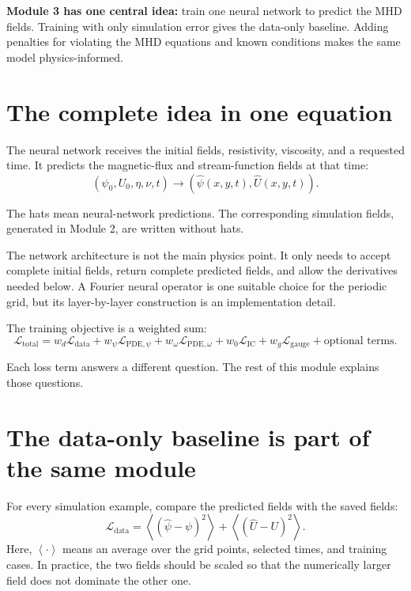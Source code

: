\documentclass[11pt]{article}
\newcommand{\avg}[1]{\left\langle #1\right\rangle}
\newcommand{\Ldata}{\mathcal L_{\mathrm{data}}}
\newcommand{\Lpdepsi}{\mathcal L_{\mathrm{PDE},\psi}}
\newcommand{\Lpdeomega}{\mathcal L_{\mathrm{PDE},\omega}}
\newcommand{\Lic}{\mathcal L_{\mathrm{IC}}}
\newcommand{\Lgauge}{\mathcal L_{\mathrm{gauge}}}
\newcommand{\Ltotal}{\mathcal L_{\mathrm{total}}}
\begin{document}

\begin{overviewbox}
\textbf{Module 3 has one central idea:} train one neural network to predict the MHD fields. Training with only simulation error gives the data-only baseline. Adding penalties for violating the MHD equations and known conditions makes the same model physics-informed.
\end{overviewbox}

\ProjectTOC

\section{The complete idea in one equation}

The neural network receives the initial fields, resistivity, viscosity, and a requested time. It predicts the magnetic-flux and stream-function fields at that time:
\begin{equation}
\boxed{
(\psi_0,U_0,\eta,\nu,t)
\longrightarrow
(\widehat\psi(x,y,t),\widehat U(x,y,t)).
}
\end{equation}

The hats mean neural-network predictions. The corresponding simulation fields, generated in Module 2, are written without hats.

The network architecture is not the main physics point. It only needs to accept complete initial fields, return complete predicted fields, and allow the derivatives needed below. A Fourier neural operator is one suitable choice for the periodic grid, but its layer-by-layer construction is an implementation detail.

The training objective is a weighted sum:
\begin{equation}
\boxed{
\Ltotal
=w_d\Ldata
+w_{\psi}\Lpdepsi
+w_{\omega}\Lpdeomega
+w_0\Lic
+w_g\Lgauge
+\text{optional terms}.
}
\label{eq:total_preview}
\end{equation}

Each loss term answers a different question. The rest of this module explains those questions.

\section{The data-only baseline is part of the same module}

For every simulation example, compare the predicted fields with the saved fields:
\begin{equation}
\boxed{
\Ldata
=\avg{(\widehat\psi-\psi)^2}
+\avg{(\widehat U-U)^2}.
}
\label{eq:data_loss}
\end{equation}
Here, $\avg{\cdot}$ means an average over the grid points, selected times, and training cases. In practice, the two fields should be scaled so that the numerically larger field does not dominate the other one.
\end{document}
